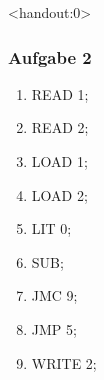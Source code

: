 \documentclass[aspectratio=1610,onlymath, ngerman]{beamer}
\begin{document}
	\begin{frame}<handout:0> \frametitle{Aufgabe 2}
	\small
		\begin{minipage}{\dimexpr0.33\linewidth-\fboxrule-\fboxsep}
			\begin{ttfamily}
				\begin{enumerate}[label=\arabic*:, nolistsep, leftmargin=*]
					\item READ 1;
					\item READ 2; 
					\item LOAD 1;
				\end{enumerate}
			\end{ttfamily}
		\end{minipage}
		\begin{minipage}{\dimexpr0.33\linewidth-\fboxrule-\fboxsep}
			\begin{ttfamily}
				\begin{enumerate}[label=\arabic*:, nolistsep, leftmargin=*]
					\setcounter{enumi}{3}
					\item LOAD 2;
					\item LIT 0; 
					\item SUB;
				\end{enumerate}
			\end{ttfamily}
		\end{minipage}
		\begin{minipage}{\dimexpr0.33\linewidth-\fboxrule-\fboxsep}
			\begin{ttfamily}
				\begin{enumerate}[label=\arabic*:, nolistsep, leftmargin=*]
					\setcounter{enumi}{6}
					\item JMC 9;
					\item JMP 5; 
					\item WRITE 2;
				\end{enumerate}
			\end{ttfamily}
		\end{minipage}
	\end{frame}
\end{document}
